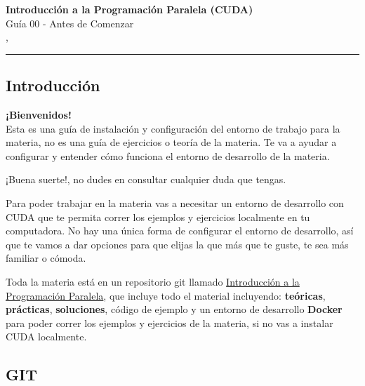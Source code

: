 



\begin{center}
  \LARGE\textbf{Introducción a la Programación Paralela (CUDA)} \\
  \Large{Guía 00 - Antes de Comenzar} \\
  \normalsize{\currentsemester, \currentyear} \\
  \vspace{1em}
  \hrule
\end{center}

\vspace{1em}

\setcounter{section}{1}

\subsection{Introducción}
\label{sec:set_up}

\begin{tcolorbox}[colback=mint,colframe=mint!75!black,arc=0pt,outer arc=0pt]
  \textbf{¡Bienvenidos!} \\

  Esta es una guía de instalación y configuración del entorno de trabajo para la materia, no es una guía de ejercicios o
  teoría de la materia. Te va a ayudar a configurar y entender cómo funciona el entorno de desarrollo de la materia.

  ¡Buena suerte!, no dudes en consultar cualquier duda que tengas.
\end{tcolorbox}

Para poder trabajar en la materia vas a necesitar un entorno de desarrollo con CUDA que te permita correr los ejemplos y
ejercicios localmente en tu computadora. No hay una única forma de configurar el entorno de desarrollo, así que te vamos
a dar opciones para que elijas la que más que te guste, te sea más familiar o cómoda.

Toda la materia está en un repositorio git llamado
\href{https://github.com/felixcuello/up-introduccion-a-la-programacion-paralela}{Introducción a la Programación
Paralela}, que incluye todo el material incluyendo: \textbf{teóricas}, \textbf{prácticas}, \textbf{soluciones}, código
de ejemplo y un entorno de desarrollo \textbf{Docker} para poder correr los ejemplos y ejercicios de la materia, si no
vas a instalar CUDA localmente.

\subsection{GIT}


